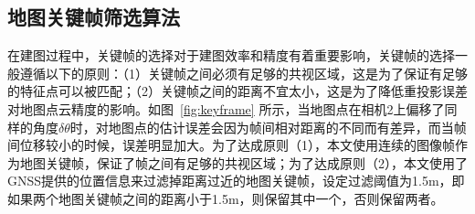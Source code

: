 \subsection{地图关键帧筛选算法}
在建图过程中，关键帧的选择对于建图效率和精度有着重要影响，关键帧的选择一般遵循以下的原则：（1）关键帧之间必须有足够的共视区域，这是为了保证有足够的特征点可以被匹配；（2）关键帧之间的距离不宜太小，这是为了降低重投影误差对地图点云精度的影响。如图~\ref{fig:keyframe} 所示，当地图点在相机2上偏移了同样的角度$\delta \theta$时，对地图点的估计误差会因为帧间相对距离的不同而有差异，而当帧间位移较小的时候，误差明显加大。为了达成原则（1），本文使用连续的图像帧作为地图关键帧，保证了帧之间有足够的共视区域；为了达成原则（2），本文使用了GNSS提供的位置信息来过滤掉距离过近的地图关键帧，设定过滤阈值为1.5m，即如果两个地图关键帧之间的距离小于1.5m，则保留其中一个，否则保留两者。

